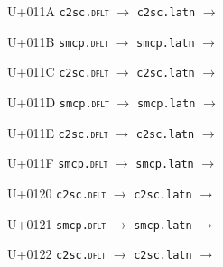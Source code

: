 \documentclass{article}
\begin{document}
\begin{substitutions}
\goodbreak

U+011A  \linebreak
    \texttt{c2sc.\textsc{dflt}} $\to$  \linebreak
    \texttt{c2sc.latn} $\to$  

\goodbreak

U+011B  \linebreak
    \texttt{smcp.\textsc{dflt}} $\to$  \linebreak
    \texttt{smcp.latn} $\to$  

\goodbreak

U+011C  \linebreak
    \texttt{c2sc.\textsc{dflt}} $\to$  \linebreak
    \texttt{c2sc.latn} $\to$  

\goodbreak

U+011D  \linebreak
    \texttt{smcp.\textsc{dflt}} $\to$  \linebreak
    \texttt{smcp.latn} $\to$  

\goodbreak

U+011E  \linebreak
    \texttt{c2sc.\textsc{dflt}} $\to$  \linebreak
    \texttt{c2sc.latn} $\to$  

\goodbreak

U+011F  \linebreak
    \texttt{smcp.\textsc{dflt}} $\to$  \linebreak
    \texttt{smcp.latn} $\to$  

\goodbreak

U+0120  \linebreak
    \texttt{c2sc.\textsc{dflt}} $\to$  \linebreak
    \texttt{c2sc.latn} $\to$  

\goodbreak

U+0121  \linebreak
    \texttt{smcp.\textsc{dflt}} $\to$  \linebreak
    \texttt{smcp.latn} $\to$  

\goodbreak

U+0122  \linebreak
    \texttt{c2sc.\textsc{dflt}} $\to$  \linebreak
    \texttt{c2sc.latn} $\to$  


\end{substitutions}
\end{document}
